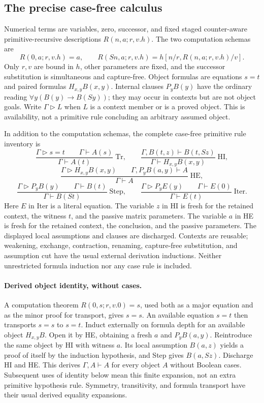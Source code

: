 \documentclass[11pt,letterpaper]{article}
\theoremstyle{definition}\newtheorem{definition}[theorem]{Definition}
\theoremstyle{remark}\newtheorem{remark}[theorem]{Remark}
\begin{document}
\subsection{The precise case-free calculus}

Numerical terms are variables, zero, successor, and fixed staged
counter-aware primitive-recursive descriptions
$R(n,a;r,v.h)$. The two computation schemas are
\[
 R(0,a;r,v.h)=a,\qquad
 R(Sn,a;r,v.h)=h[n/r,R(n,a;r,v.h)/v].
\]
Only $r,v$ are bound in $h$, other parameters are fixed, and the
successor substitution is simultaneous and capture-free. Object formulas
are equations $s=t$ and paired formulas $H_{x,y}B(x,y)$. Internal
clauses $P_yB(y)$ have the ordinary reading
$\forall y(B(y)\to B(Sy))$; they may occur in contexts but are not
object goals. Write $\Gamma\mathrel{\triangleright}L$ when $L$ is a
context member or is a proved object. This is availability, not a
primitive rule concluding an arbitrary assumed object.

In addition to the computation schemas, the complete case-free primitive
rule inventory is
\[
 \frac{\Gamma\mathrel{\triangleright}s=t\qquad
       \Gamma\vdash A(s)}{\Gamma\vdash A(t)}\;\mathrm{Tr},
 \qquad
 \frac{\Gamma,B(t,z)\vdash B(t,Sz)}
      {\Gamma\vdash H_{x,y}B(x,y)}\;\mathrm{HI},
\]
\[
 \frac{\Gamma\mathrel{\triangleright}H_{x,y}B(x,y)\qquad
       \Gamma,P_yB(a,y)\vdash A}{\Gamma\vdash A}\;\mathrm{HE},
\]
\[
 \frac{\Gamma\mathrel{\triangleright}P_yB(y)\qquad
       \Gamma\vdash B(t)}{\Gamma\vdash B(St)}\;\mathrm{Step},
 \qquad
 \frac{\Gamma\mathrel{\triangleright}P_yE(y)\qquad
       \Gamma\vdash E(0)}{\Gamma\vdash E(t)}\;\mathrm{Iter}.
\]
Here $E$ in Iter is a literal equation. The variable $z$ in HI is
fresh for the retained context, the witness $t$, and the passive matrix
parameters. The variable $a$ in HE is fresh for the retained context,
the conclusion, and the passive parameters. The displayed local
assumptions and clauses are discharged. Contexts are reusable; weakening,
exchange, contraction, renaming, capture-free substitution, and assumption
cut have the usual external derivation inductions. Neither unrestricted
formula induction nor any case rule is included.

\paragraph{Derived object identity, without cases.}
A computation theorem $R(0,s;r,v.0)=s$, used both as a major equation
and as the minor proof for transport, gives $s=s$. An available equation
$s=t$ then transports $s=s$ to $s=t$. Induct externally on formula
depth for an available object $H_{x,y}B$. Open it by HE, obtaining a
fresh $a$ and $P_yB(a,y)$. Reintroduce the same object by HI with
witness $a$. Its local assumption $B(a,z)$ yields a proof of itself by
the induction hypothesis, and Step gives $B(a,Sz)$. Discharge HI and
HE. This derives $\Gamma,A\vdash A$ for every object $A$ without
Boolean cases. Subsequent uses of identity below mean this finite
expansion, not an extra primitive hypothesis rule. Symmetry, transitivity,
and formula transport have their usual derived equality expansions.
\end{document}
